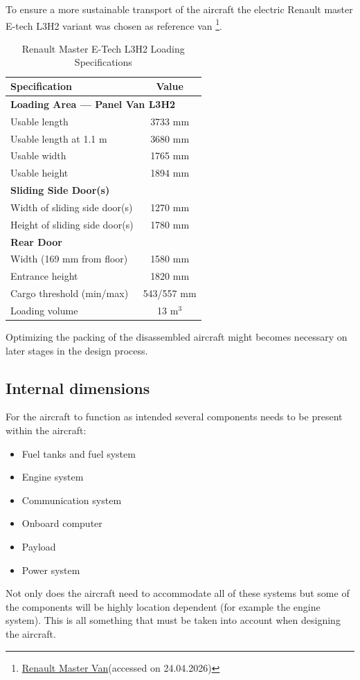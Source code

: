 To ensure a more sustainable transport of the aircraft the electric Renault master E-tech L3H2 variant was chosen as reference van \footnote{\href{https://business.renault.co.uk/master-range/master-panel-van.html}{Renault Master Van}(accessed on 24.04.2026)}. 
\begin{table}[H]
    \centering
    \caption{Renault Master E-Tech L3H2 Loading Specifications}
    \begin{tabular}{|l|c|}
        \hline
        \textbf{Specification} & \textbf{Value} \\
        \hline
        \multicolumn{2}{|l|}{\textbf{Loading Area — Panel Van L3H2}} \\
        \hline
        Usable length & 3733 mm \\
        \hline
        Usable length at 1.1 m & 3680 mm \\
        \hline
        Usable width & 1765 mm \\
        \hline
        Usable height & 1894 mm \\
        \hline
        \multicolumn{2}{|l|}{\textbf{Sliding Side Door(s)}} \\
        \hline
        Width of sliding side door(s) & 1270 mm \\
        \hline
        Height of sliding side door(s) & 1780 mm \\
        \hline
        \multicolumn{2}{|l|}{\textbf{Rear Door}} \\
        \hline
        Width (169 mm from floor) & 1580 mm \\
        \hline
        Entrance height & 1820 mm \\
        \hline
        Cargo threshold (min/max) & 543/557 mm \\
        \hline
        Loading volume & 13 m$^3$ \\
        \hline
    \end{tabular}
    \label{tab:renault_master_specs}
\end{table}
Optimizing the packing of the disassembled aircraft might becomes necessary on later stages in the design process.


\subsection*{Internal dimensions}
For the aircraft to function as intended several components needs to be present within the aircraft: 
\begin{itemize}
    \item Fuel tanks and fuel system
    \item Engine system
    \item Communication system 
    \item Onboard computer
    \item Payload
    \item Power system
\end{itemize}
Not only does the aircraft need to accommodate all of these systems but some of the components will be highly location dependent (for example the engine system). This is all something that must be taken into account when designing the aircraft.   





